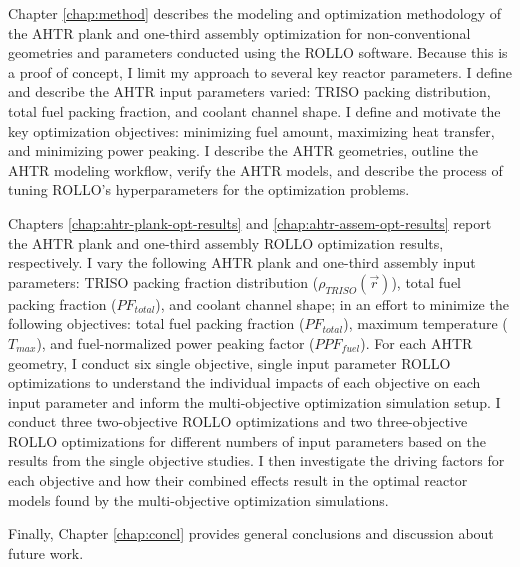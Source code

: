 Chapter \ref{chap:method} describes the modeling and optimization methodology of the 
\gls{AHTR} plank and one-third assembly optimization for non-conventional 
geometries and parameters conducted using the \gls{ROLLO} software.
Because this is a proof of concept, I limit my approach to several key reactor 
parameters. 
I define and describe the \gls{AHTR} input parameters varied: \gls{TRISO} packing 
distribution, total fuel packing fraction, and coolant channel shape.
I define and motivate the key optimization objectives: minimizing fuel amount,
maximizing heat transfer, and minimizing power peaking.
I describe the \gls{AHTR} geometries, outline the \gls{AHTR} modeling workflow, 
verify the \gls{AHTR} models, and describe the process of tuning \gls{ROLLO}'s 
hyperparameters for the optimization problems.

Chapters \ref{chap:ahtr-plank-opt-results} and \ref{chap:ahtr-assem-opt-results} 
report the \gls{AHTR} plank and one-third assembly \gls{ROLLO} optimization results, 
respectively. 
I vary the following \gls{AHTR} plank and one-third assembly input parameters: 
\gls{TRISO} packing fraction distribution ($\rho_{TRISO}(\vec{r})$), total fuel 
packing fraction ($PF_{total}$), and coolant channel shape; in an effort to minimize 
the following objectives: total fuel packing fraction ($PF_{total}$), maximum 
temperature ($T_{max}$), and fuel-normalized power peaking factor ($PPF_{fuel}$). 
For each \gls{AHTR} geometry, I conduct six single objective, single input parameter 
\gls{ROLLO} optimizations to understand the individual impacts of each objective on 
each input parameter and inform the multi-objective optimization simulation setup. 
I conduct three two-objective \gls{ROLLO} optimizations and two three-objective 
\gls{ROLLO} optimizations for different numbers of input parameters based on the 
results from the single objective studies. 
I then investigate the driving factors for each objective and how their combined 
effects result in the optimal reactor models found by the multi-objective 
optimization simulations. 

Finally, Chapter \ref{chap:concl} provides general conclusions and discussion about 
future work. 